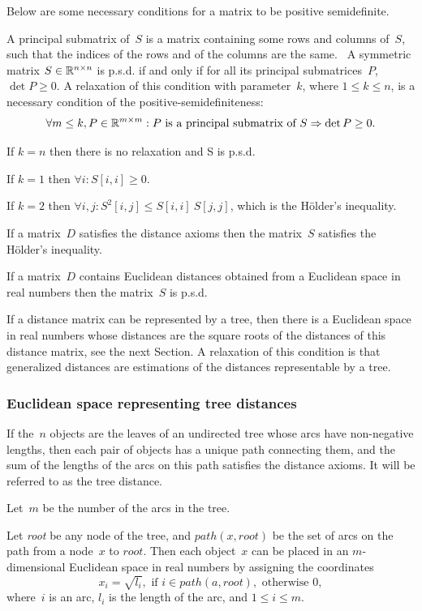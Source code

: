 \documentclass[10pt,a4paper]{article}
\begin{document}
Below are some necessary conditions for a matrix to be positive semidefinite.

A principal submatrix of~$S$ is a matrix containing some rows and columns of~$S$, such that the indices of the rows and of the columns are the same. \
A symmetric matrix $S \in \mathbb R^{n \times n}$ is p.s.d. if and only if for all its principal submatrices~$P$, $\det P \ge 0$. 
A relaxation of this condition with parameter~$k$, where $1 \le k \le n$, is a necessary condition of the positive-semidefiniteness:
$$ \forall m \le k, P \in \mathbb R^{m \times m} : P \text { is a principal submatrix of } S \Rightarrow \det P \ge 0. $$

If $k = n$ then there is no relaxation and S is p.s.d. 

If $k = 1$ then $\forall i : S[i,i] \ge 0$. 

If $k = 2$ then $\forall i, j : S^2[i,j] \le S[i,i] \ S[j,j]$, which is the H\"older's inequality. 

If a matrix~$D$ satisfies the distance axioms then the matrix~$S$ satisfies the H\"older's inequality. 

If a matrix~$D$ contains Euclidean distances obtained from a Euclidean space in real numbers then the matrix~$S$ is p.s.d.

If a distance matrix can be represented by a tree, then there is a Euclidean space in real numbers 
whose distances are the square roots of the distances of this distance matrix, see the next Section.
A relaxation of this condition is that generalized distances are estimations of the distances representable by a tree.


\subsubsection {Euclidean space representing tree distances}

If the~$n$ objects are the leaves of an undirected tree whose arcs have non-negative lengths, 
then each pair of objects has a unique path connecting them, and the sum of the lengths of the arcs on this path satisfies the distance axioms. 
It will be referred to as the tree distance. 

Let~$m$ be the number of the arcs in the tree.

Let {\em root} be any node of the tree, and $path(x,root)$ be the set of arcs on the path from a node~$x$ to $root$. 
Then each object~$x$ can be placed in an $m$-dimensional Euclidean space in real numbers by assigning the coordinates
$$ x_i = \sqrt{l_i}, \text { if } i \in path(a,root), \text { otherwise } 0, $$
where~$i$ is an arc, $l_i$ is the length of the arc, and $1 \le i \le m$. 
\end{document}
